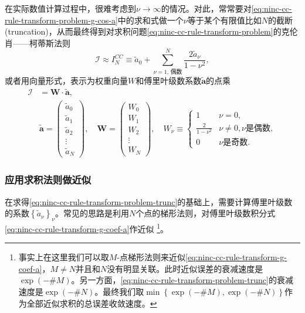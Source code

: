 在实际数值计算过程中，很难考虑到$\nu \rightarrow \infty$的情况。对此，常常要对\eqref{eq:ninc-cc-rule-transform-problem-g-cos-a}中的求和式做一个$\nu$等于某个有限值比如$N$的截断(truncation)，从而最终得到对求积问题\eqref{eq:ninc-cc-rule-transform-problem}的克伦肖——柯蒂斯法则
\begin{equation}
  \label{eq:ninc-cc-rule-transform-problem-trunc}
  \mathcal{I} \approx I_{N}^{CC} \equiv \tilde{a}_{0} + \sum_{\nu=1,\, \text{偶数}}^{N} \frac{2 \tilde{a}_{\nu}}{1 - \nu^{2}},
\end{equation}
或者用向量形式，表示为权重向量$W$和傅里叶级数系数$\tilde{\bm{a}}$的点乘
\begin{equation}
  \label{eq:ninc-cc-rule-transform-problem-trunc-vector}
  \begin{split}
      \mathcal{I} & = \bm{W} \cdot \bm{\tilde{a}}, \\
      & \bm{\tilde{a}} =
      \begin{pmatrix}
        \tilde{a}_{0} \\
        \tilde{a}_{1} \\
        \tilde{a}_{2} \\
        \vdots \\
        \tilde{a}_{N}
      \end{pmatrix}, \quad
      \bm{W} =
      \begin{pmatrix}
        W_{0} \\
        W_{1} \\
        W_{2} \\
        \vdots \\
        W_{N}
      \end{pmatrix}, \quad
      W_{\nu} \equiv \begin{cases}
      1 & \nu = 0, \\
      \frac{2}{1 - \nu^{2}} & \nu \neq 0, \nu \text{是偶数}, \\
      0 & \nu \text{是奇数}.
      \end{cases}
  \end{split}
\end{equation}

\subsubsection{应用求积法则做近似}
在求得\eqref{eq:ninc-cc-rule-transform-problem-trunc}的基础上，需要计算傅里叶级数的系数$\left\{ \tilde{a}_{\nu} \right\}_{\nu}$。常见的思路是利用$N$个点的梯形法则，对傅里叶级数积分式\eqref{eq:ninc-cc-rule-transform-g-coef-a}作近似
\footnote{事实上在这里我们可以取$M$-点梯形法则来近似\eqref{eq:ninc-cc-rule-transform-g-coef-a}，$M\neq N$并且和$N$没有明显关联。此时近似误差的衰减速度是$\exp \left( - \# M \right)$。另一方面，\eqref{eq:ninc-cc-rule-transform-problem-trunc}的衰减速度是$\exp \left( - \# N \right)$。最终我们取$ \min \left\{\exp \left( - \# M \right),\exp \left( - \# N \right) \right\}$作为全部近似求积的总误差收敛速度。}。

